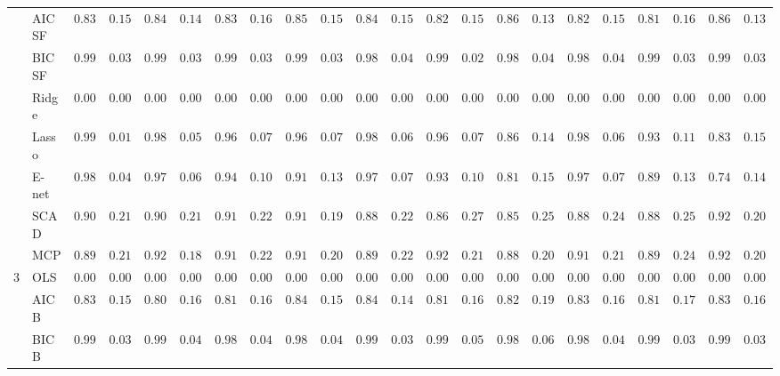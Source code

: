 \begin{tabular}{ll|ll|llllll|llllll|llllll}
	& AIC SF  & $0.8317$ & $0.1526$ & $0.8483$ & $0.1443$ & $0.8367$ & $0.1606$ & $0.8500$ & $0.1544$ & $0.8450$ & $0.1503$ & $0.8233$ & $0.1514$ & $0.8683$ & $0.1387$ & $0.8267$ & $0.1570$ & $0.8167$ & $0.1683$ & $0.8633$ & $0.1369$ \\
	& BIC SF  & $0.9917$ & $0.0365$ & $0.9900$ & $0.0398$ & $0.9917$ & $0.0365$ & $0.9900$ & $0.0398$ & $0.9883$ & $0.0427$ & $0.9950$ & $0.0286$ & $0.9883$ & $0.0489$ & $0.9883$ & $0.0489$ & $0.9933$ & $0.0328$ & $0.9900$ & $0.0398$ \\
	& Ridge  & $0.0000$ & $0.0000$ & $0.0000$ & $0.0000$ & $0.0000$ & $0.0000$ & $0.0000$ & $0.0000$ & $0.0000$ & $0.0000$ & $0.0000$ & $0.0000$ & $0.0000$ & $0.0000$ & $0.0000$ & $0.0000$ & $0.0000$ & $0.0000$ & $0.0000$ & $0.0000$ \\
	& Lasso  & $0.9983$ & $0.0167$ & $0.9850$ & $0.0535$ & $0.9683$ & $0.0775$ & $0.9600$ & $0.0754$ & $0.9833$ & $0.0691$ & $0.9683$ & $0.0738$ & $0.8650$ & $0.1492$ & $0.9800$ & $0.0639$ & $0.9383$ & $0.1102$ & $0.8317$ & $0.1562$ \\
	& E-net  & $0.9883$ & $0.0427$ & $0.9783$ & $0.0611$ & $0.9467$ & $0.1002$ & $0.9117$ & $0.1329$ & $0.9750$ & $0.0763$ & $0.9333$ & $0.1086$ & $0.8167$ & $0.1580$ & $0.9733$ & $0.0739$ & $0.8917$ & $0.1306$ & $0.7450$ & $0.1469$ \\
	& SCAD  & $0.9000$ & $0.2145$ & $0.9017$ & $0.2146$ & $0.9133$ & $0.2228$ & $0.9167$ & $0.1975$ & $0.8850$ & $0.2256$ & $0.8617$ & $0.2763$ & $0.8583$ & $0.2556$ & $0.8850$ & $0.2492$ & $0.8817$ & $0.2510$ & $0.9217$ & $0.2002$ \\
	& MCP  & $0.8983$ & $0.2144$ & $0.9283$ & $0.1869$ & $0.9100$ & $0.2228$ & $0.9133$ & $0.2085$ & $0.8900$ & $0.2238$ & $0.9250$ & $0.2137$ & $0.8817$ & $0.2069$ & $0.9100$ & $0.2124$ & $0.8900$ & $0.2453$ & $0.9200$ & $0.2017$ \\\hline
	3 & OLS  & $0.0000$ & $0.0000$ & $0.0000$ & $0.0000$ & $0.0000$ & $0.0000$ & $0.0000$ & $0.0000$ & $0.0000$ & $0.0000$ & $0.0000$ & $0.0000$ & $0.0000$ & $0.0000$ & $0.0000$ & $0.0000$ & $0.0000$ & $0.0000$ & $0.0000$ & $0.0000$ \\
	& AIC B  & $0.8317$ & $0.1526$ & $0.8033$ & $0.1698$ & $0.8167$ & $0.1683$ & $0.8467$ & $0.1583$ & $0.8467$ & $0.1473$ & $0.8100$ & $0.1675$ & $0.8200$ & $0.1934$ & $0.8383$ & $0.1666$ & $0.8183$ & $0.1726$ & $0.8300$ & $0.1624$ \\
	& BIC B  & $0.9917$ & $0.0365$ & $0.9900$ & $0.0463$ & $0.9883$ & $0.0489$ & $0.9867$ & $0.0454$ & $0.9900$ & $0.0398$ & $0.9900$ & $0.0571$ & $0.9850$ & $0.0631$ & $0.9883$ & $0.0489$ & $0.9917$ & $0.0365$ & $0.9917$ & $0.0365$ \\

\end{tabular}
